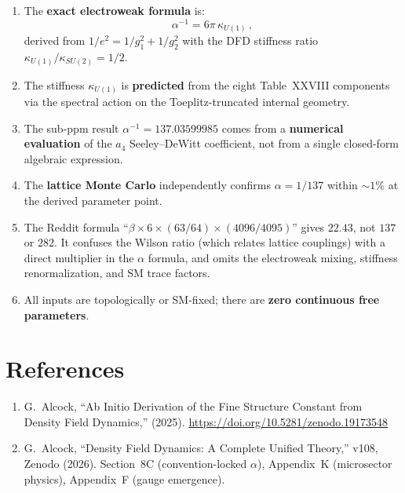 \documentclass[12pt,a4paper]{article}
\begin{document}
\begin{enumerate}
\item The \textbf{exact electroweak formula} is:
\begin{equation}
\alpha^{-1} = 6\pi\,\kappa_{U(1)}\,,
\end{equation}
derived from $1/e^2 = 1/g_1^2 + 1/g_2^2$ with the DFD stiffness ratio
$\kappa_{U(1)}/\kappa_{SU(2)} = 1/2$.

\item The stiffness $\kappa_{U(1)}$ is \textbf{predicted} from the eight
  Table~XXVIII components via the spectral action on the Toeplitz-truncated
  internal geometry.

\item The sub-ppm result $\alpha^{-1} = 137.03599985$ comes from a
  \textbf{numerical evaluation} of the $a_4$ Seeley--DeWitt coefficient,
  not from a single closed-form algebraic expression.

\item The \textbf{lattice Monte Carlo} independently confirms $\alpha = 1/137$
  within $\sim 1\%$ at the derived parameter point.

\item The Reddit formula ``$\beta \times 6 \times (63/64) \times (4096/4095)$''
  gives $22.43$, not $137$ or $282$.  It confuses the Wilson ratio (which
  relates lattice couplings) with a direct multiplier in the $\alpha$ formula,
  and omits the electroweak mixing, stiffness renormalization, and SM trace
  factors.

\item All inputs are topologically or SM-fixed; there are
  \textbf{zero continuous free parameters}.
\end{enumerate}

\section*{References}

\begin{enumerate}
\item[{[1]}] G.~Alcock, ``Ab Initio Derivation of the Fine Structure Constant
  from Density Field Dynamics,'' (2025).
  \url{https://doi.org/10.5281/zenodo.19173548}

\item[{[2]}] G.~Alcock, ``Density Field Dynamics: A Complete Unified Theory,''
  v108, Zenodo (2026).  Section~8C (convention-locked $\alpha$), Appendix~K
  (microsector physics), Appendix~F (gauge emergence).
\end{enumerate}
\end{document}

